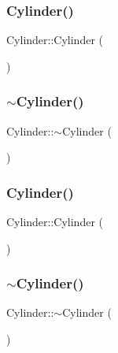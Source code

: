 \subsubsection{\texorpdfstring{Cylinder()}{Cylinder()}\hspace{0.1cm}{\footnotesize\ttfamily [1/3]}}
{\footnotesize\ttfamily Cylinder\+::\+Cylinder (\begin{DoxyParamCaption}{ }\end{DoxyParamCaption})}

\mbox{\label{class_cylinder_a05ab556f0ae3cd6e99d9d1f3caca80b3}} 
\subsubsection{\texorpdfstring{$\sim$Cylinder()}{~Cylinder()}\hspace{0.1cm}{\footnotesize\ttfamily [1/3]}}
{\footnotesize\ttfamily Cylinder\+::$\sim$\+Cylinder (\begin{DoxyParamCaption}{ }\end{DoxyParamCaption})}

\mbox{\label{class_cylinder_a01dc978cb576f834b9545e43d4dad2a2}} 
\subsubsection{\texorpdfstring{Cylinder()}{Cylinder()}\hspace{0.1cm}{\footnotesize\ttfamily [2/3]}}
{\footnotesize\ttfamily Cylinder\+::\+Cylinder (\begin{DoxyParamCaption}{ }\end{DoxyParamCaption})}

\mbox{\label{class_cylinder_a05ab556f0ae3cd6e99d9d1f3caca80b3}} 
\subsubsection{\texorpdfstring{$\sim$Cylinder()}{~Cylinder()}\hspace{0.1cm}{\footnotesize\ttfamily [2/3]}}
{\footnotesize\ttfamily Cylinder\+::$\sim$\+Cylinder (\begin{DoxyParamCaption}{ }\end{DoxyParamCaption})}

